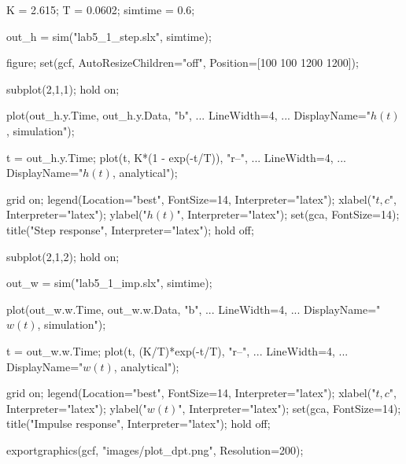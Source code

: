 \begin{matlabcode}
K = 2.615;
T = 0.0602;
simtime = 0.6;

out_h = sim("lab5_1_step.slx", simtime);

figure;
set(gcf, AutoResizeChildren="off", Position=[100 100 1200 1200]);

subplot(2,1,1);
hold on;

plot(out_h.y.Time, out_h.y.Data, "b", ...
     LineWidth=4, ...
     DisplayName="$h(t)$, simulation");

t = out_h.y.Time;
plot(t, K*(1 - exp(-t/T)), "r--", ...
     LineWidth=4, ...
     DisplayName="$h(t)$, analytical");

grid on;
legend(Location="best", FontSize=14, Interpreter="latex");
xlabel("$t, c$", Interpreter="latex");
ylabel("$h(t)$", Interpreter="latex");
set(gca, FontSize=14);
title("Step response", Interpreter="latex");
hold off;

subplot(2,1,2);
hold on;

out_w = sim("lab5_1_imp.slx", simtime);

plot(out_w.w.Time, out_w.w.Data, "b", ...
     LineWidth=4, ...
     DisplayName="$w(t)$, simulation");

t = out_w.w.Time;
plot(t, (K/T)*exp(-t/T), "r--", ...
     LineWidth=4, ...
     DisplayName="$w(t)$, analytical");

grid on;
legend(Location="best", FontSize=14, Interpreter="latex");
xlabel("$t, c$", Interpreter="latex");
ylabel("$w(t)$", Interpreter="latex");
set(gca, FontSize=14);
title("Impulse response", Interpreter="latex");
hold off;

exportgraphics(gcf, "images/plot_dpt.png", Resolution=200);
\end{matlabcode}


